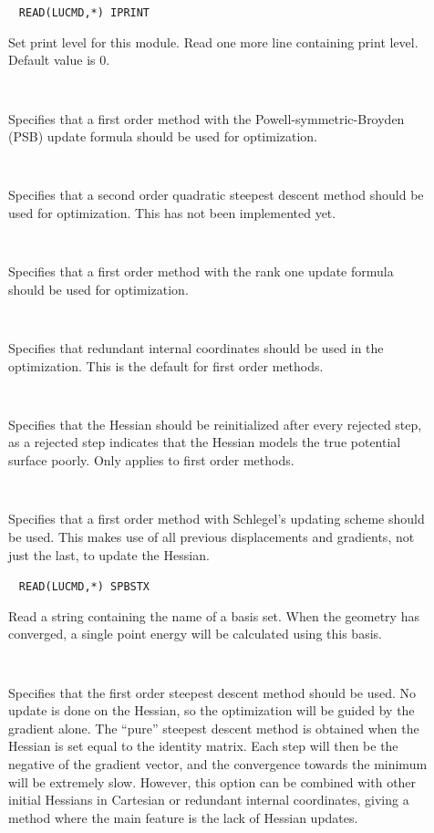 \begin{description}
\item[]\verb| |
\newline
\verb|READ(LUCMD,*) IPRINT|

Set print level for this module.  Read one more line containing print
level. Default value is 0.

\item[]\verb| |

Specifies that a first order method with the
Powell-symmetric-Broyden (PSB) update formula should be used
for optimization.

\item[]\verb| |

Specifies that a second order quadratic steepest
descent method should be used for optimization. This has not been
implemented yet.

\item[]\verb| |

Specifies that a first order method with the rank
one update formula should be used for optimization.

\item[]\verb| |

Specifies that redundant internal coordinates should be used in the
optimization. This is the default for first order methods.

\item[]\verb| |

Specifies that the Hessian should be reinitialized after every
rejected step, as a rejected step indicates that the Hessian models the
true potential surface poorly. Only applies to first order methods.

\item[]\verb| |

Specifies that a first order method with Schlegel's updating scheme
\cite{Schlegel} should be used. This makes use of all previous
displacements and gradients, not just the last, to update the
Hessian.

\item[]\verb| |
\newline
\verb|READ(LUCMD,*) SPBSTX|

Read a string containing the name of a basis set. When the geometry
has converged, a single point energy will be calculated using this
basis.

\item[]\verb| |

Specifies that the first order steepest descent method should be
used. No update is done on the Hessian, so the optimization will be
guided by the gradient alone. The ``pure'' steepest descent method is
obtained when the Hessian is set equal to the identity matrix. Each
step will then be the negative of the gradient vector, and the
convergence towards the minimum will be extremely slow. However, this
option can be combined with other initial Hessians in Cartesian or
redundant internal coordinates, giving a method where the main feature
is the lack of Hessian updates.


\end{description}
